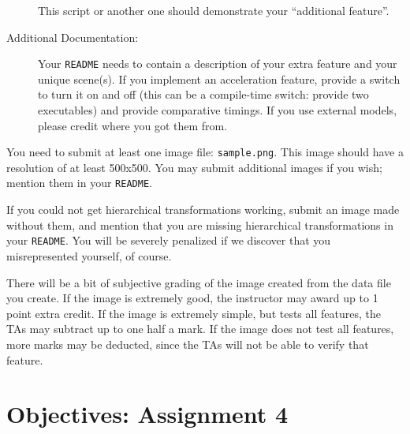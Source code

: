 \begin{description}
	This script or another one should demonstrate your ``additional 
	feature''.   

\item[Additional Documentation:]
	Your {\tt README} needs to contain a description of
		your extra feature and your unique scene(s).
	If you implement an acceleration feature, provide a switch to
	turn it on and off (this can be a compile-time switch: provide
	two executables) and provide comparative timings.  If you
        use external models, please credit where you got them from.
\end{description}

You need to submit at least one image file: {\tt sample.png}.  
This image should have a resolution of at least 500x500.  
You may submit additional images if you wish; 
mention them in your {\tt README}.

If you could not get hierarchical transformations working, submit
an image made without them, and mention that you are missing
hierarchical transformations in your {\tt README}.  You will be
severely penalized if we discover that you misrepresented yourself, 
of course.

There will be a bit of subjective grading of the image created from
the data file you create.  If the image is extremely good, the
instructor may award up to 1 point extra credit.  
If the image is extremely simple, but tests all features,
the TAs may subtract up to one half a mark.  
If the image does not
test all features, more marks may be deducted, since the TAs will
not be able to verify that feature.

\newpage
\section{Objectives: \hfill Assignment 4}
 \bigskip

 \bigskip

 \bigskip


